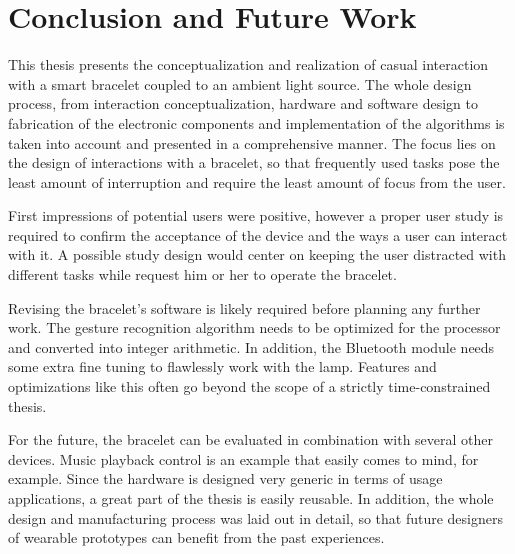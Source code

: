 \chapter{Conclusion and Future Work}

This thesis presents the conceptualization and realization of casual interaction with a smart bracelet coupled to an ambient light source. The whole design process, from interaction conceptualization, hardware and software design to fabrication of the electronic components and implementation of the algorithms is taken into account and presented in a comprehensive manner. The focus lies on the design of interactions with a bracelet, so that frequently used tasks pose the least amount of interruption and require the least amount of focus from the user.

First impressions of potential users were positive, however a proper user study is required to confirm the acceptance of the device and the ways a user can interact with it. A possible study design would center on keeping the user distracted with different tasks while request him or her to operate the bracelet.

Revising the bracelet's software is likely required before planning any further work. The gesture recognition algorithm needs to be optimized for the processor and converted into integer arithmetic. In addition, the Bluetooth module needs some extra fine tuning to flawlessly work with the lamp. Features and optimizations like this often go beyond the scope of a strictly time-constrained thesis.

For the future, the bracelet can be evaluated in combination with several other devices. Music playback control is an example that easily comes to mind, for example. Since the hardware is designed very generic in terms of usage applications, a great part of the thesis is easily reusable. In addition, the whole design and manufacturing process was laid out in detail, so that future designers of wearable prototypes can benefit from the past experiences.


